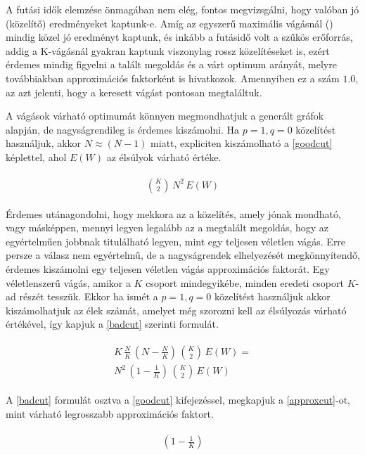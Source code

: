 A futási idők elemzése önmagában nem elég, fontos megvizsgálni, hogy valóban jó (közelítő) eredményeket kaptunk-e. Amíg az egyszerű maximális vágásnál () mindig közel jó eredményt kaptunk, és inkább a futásidő volt a szűkös erőforrás, addig a K-vágásnál gyakran kaptunk viszonylag rossz közelítéseket is, ezért érdemes mindig figyelni a talált megoldás és a várt optimum arányát, melyre továbbiakban approximációs faktorként is hivatkozok. Amennyiben ez a szám $1.0$, az azt jelenti, hogy a keresett vágást pontosan megtaláltuk.

A vágások várható optimumát könnyen megmondhatjuk a generált gráfok alapján, de nagyságrendileg is érdemes kiszámolni. Ha $p=1, q=0$ közelítést használjuk, akkor $N \approx (N-1)$ miatt, expliciten kiszámolható a \ref{goodcut} képlettel, ahol $E(W)$ az élsúlyok várható értéke.

\begin{align}
	\begin{split}
		\binom{K}{2} \, N^2 \, E(W) \label{goodcut}		
	\end{split}
\end{align}

Érdemes utánagondolni, hogy mekkora az a közelítés, amely jónak mondható, vagy másképpen, mennyi legyen legalább az a megtalált megoldás, hogy az egyértelműen jobbnak titulálható legyen, mint egy teljesen véletlen vágás. Erre persze a válasz nem egyértelmű, de a nagyságrendek elhelyezését megkönnyítendő, érdemes kiszámolni egy teljesen véletlen vágás approximációs faktorát. Egy véletlenszerű vágás, amikor a $K$ csoport mindegyikébe, minden eredeti csoport $K$-ad részét tesszük. Ekkor ha ismét a $p=1, q=0$ közelítést használjuk akkor kiszámolhatjuk az élek számát, amelyet még szorozni kell az élsúlyozás várható értékével, így kapjuk a \ref{badcut} szerinti formulát. 

\begin{align}
	\begin{split}
		K \, \frac{N}{K} \, \left( N-\frac{N}{K} \right) \, \binom{K}{2} \, E(W) = \label{badcut} \\
		 N^2 \, \left( 1 -\frac{1}{K} \right) \,\binom{K}{2} \, E(W)
	\end{split}
\end{align}

A \ref{badcut} formulát osztva a \ref{goodcut} kifejezéssel, megkapjuk a \ref{approxcut}-ot, mint várható legrosszabb approximációs faktort.

\begin{align}
	\begin{split}
		\left( 1 -\frac{1}{K} \right) \label{approxcut}
	\end{split}
\end{align}

